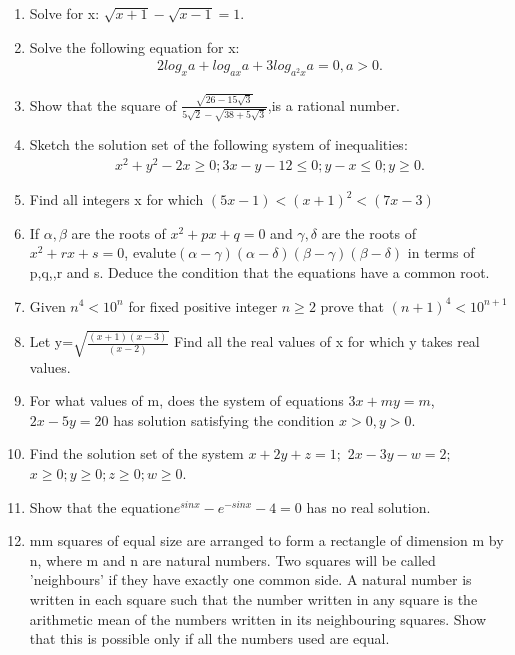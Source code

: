 \begin{enumerate}[label=\arabic*.,ref=\thesubsection.\theenumi]
\item Solve for x: $\sqrt{x+1}-\sqrt{x-1}=1$.

\item Solve the following equation for x:
\begin{align} 
2log_{x} a+log_{ax} a+3log_{a^2{x}} a=0, a>0.
\end{align}
\item Show that the square of $\frac{\sqrt{26-15\sqrt{3}}}{5\sqrt{2}-\sqrt{38+5\sqrt{3}}}$,is a rational number.

\item Sketch the solution set of the following system of inequalities: 
\begin{align}
x^{2}+y^{2}-2x\geq0;3x-y-12\leq0;y-x\leq0;y\geq0.
\end{align}

\item Find all integers x for which $(5x-1)<(x+1)^2<(7x-3)$

\item If $\alpha,\beta$ are the roots of $x^2+px+q=0$ and $\gamma,\delta$ are the roots of $x^2+rx+s=0$, evalute$(\alpha-\gamma)(\alpha-\delta)(\beta-\gamma)(\beta-\delta)$ in terms of p,q,,r and s. Deduce the condition that the equations have a common root.

\item Given $n^4<10^n$ for fixed positive integer $n\geq2$ prove that $(n+1)^4<10^{n+1}$

\item Let y=$\sqrt{\frac{(x+1)(x-3)}{(x-2)}}$ Find all the real values of x for which y takes real values.

\item For what values of m, does the system of equations $3x+my=m$,$2x-5y=20$ has solution satisfying the condition $x>0,y>0$.

\item Find the solution set of the system $x+2y+z=1;$ $2x-3y-w=2;$ $x\geq0;y\geq0;z\geq0;w\geq0$.

\item Show that the equation$e^{sinx}-e^{-sinx}-4=0$ has no real solution.

\item mm squares of equal size are arranged to form a rectangle of dimension m by n, where m and n are natural numbers. Two squares will be called 'neighbours' if they have exactly one common side. A natural number is written in each square such that the number written in any square is the arithmetic mean of the numbers written in its neighbouring squares. Show that this is possible only if all the numbers used are equal.


\end{enumerate}
